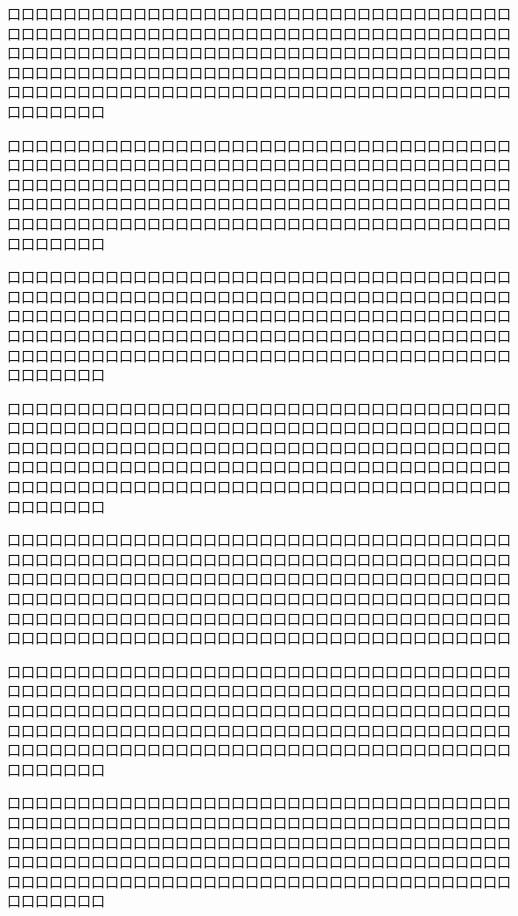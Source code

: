 口口口口口口口口口口口口口口口口口口口口口口口口口口口口口口口口口口口口口口口口口口口口口口口口口口口口口口口口口口口口口口口口口口口口口口口口口口口口口口口口口口口口口口口口口口口口口口口口口口口口口口口口口口口口口口口口口口口口口口口口口口口口口口口口口口口口口口口口口口口口口口口口口口口口口口口口口口口口口口口口口口口口口口口口口口口口口口口口口口口口口口口口口口口


口口口口口口口口口口口口口口口口口口口口口口口口口口口口口口口口口口口口口口口口口口口口口口口口口口口口口口口口口口口口口口口口口口口口口口口口口口口口口口口口口口口口口口口口口口口口口口口口口口口口口口口口口口口口口口口口口口口口口口口口口口口口口口口口口口口口口口口口口口口口口口口口口口口口口口口口口口口口口口口口口口口口口口口口口口口口口口口口口口口口口口口口口口口


口口口口口口口口口口口口口口口口口口口口口口口口口口口口口口口口口口口口口口口口口口口口口口口口口口口口口口口口口口口口口口口口口口口口口口口口口口口口口口口口口口口口口口口口口口口口口口口口口口口口口口口口口口口口口口口口口口口口口口口口口口口口口口口口口口口口口口口口口口口口口口口口口口口口口口口口口口口口口口口口口口口口口口口口口口口口口口口口口口口口口口口口口口口


口口口口口口口口口口口口口口口口口口口口口口口口口口口口口口口口口口口口口口口口口口口口口口口口口口口口口口口口口口口口口口口口口口口口口口口口口口口口口口口口口口口口口口口口口口口口口口口口口口口口口口口口口口口口口口口口口口口口口口口口口口口口口口口口口口口口口口口口口口口口口口口口口口口口口口口口口口口口口口口口口口口口口口口口口口口口口口口口口口口口口口口口口口口


口口口口口口口口口口口口口口口口口口口口口口口口口口口口口口口口口口口口口口口口口口口口口口口口口口口口口口口口口口口口口口口口口口口口口口口口口口口口口口口口口口口口口口口口口口口口口口口口口口口口口口口口口口口口口口口口口口口口口口口口口口口口口口口口口口口口口口口口口口口口口口口口口口口口口口口口口口口口口口口口口口口口口口口口口口口口口口口口口口口口口口口口口口口口口口口口口口口口口口口口口口口口口口口口口口口口口口口口

口口口口口口口口口口口口口口口口口口口口口口口口口口口口口口口口口口口口口口口口口口口口口口口口口口口口口口口口口口口口口口口口口口口口口口口口口口口口口口口口口口口口口口口口口口口口口口口口口口口口口口口口口口口口口口口口口口口口口口口口口口口口口口口口口口口口口口口口口口口口口口口口口口口口口口口口口口口口口口口口口口口口口口口口口口口口口口口口口口口口口口口口口口口

口口口口口口口口口口口口口口口口口口口口口口口口口口口口口口口口口口口口口口口口口口口口口口口口口口口口口口口口口口口口口口口口口口口口口口口口口口口口口口口口口口口口口口口口口口口口口口口口口口口口口口口口口口口口口口口口口口口口口口口口口口口口口口口口口口口口口口口口口口口口口口口口口口口口口口口口口口口口口口口口口口口口口口口口口口口口口口口口口口口口口口口口口口口

